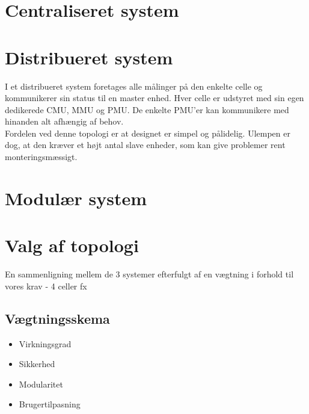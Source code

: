 \section{Centraliseret system}

\section{Distribueret system}
I et distribueret system foretages alle målinger på den enkelte celle og kommunikerer sin status til en master enhed. Hver celle er udstyret med sin egen dedikerede CMU, MMU og PMU. De enkelte PMU'er kan kommunikere med hinanden alt afhængig af behov.
\\

Fordelen ved denne topologi er at designet er simpel og pålidelig. Ulempen er dog, at den kræver et højt antal slave enheder, som kan give problemer rent monteringsmæssigt.



\section{Modulær system}

\section{Valg af topologi}
En sammenligning mellem de 3 systemer efterfulgt af en vægtning i forhold til vores krav - 4 celler fx
\subsection{Vægtningsskema}

\begin{itemize}
	\item Virkningsgrad
	\item Sikkerhed
	\item Modularitet
	\item Brugertilpasning
\end{itemize}